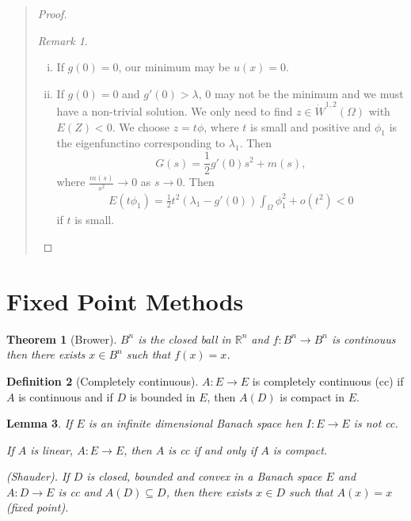 \documentclass[10pt, oneside, reqno]{amsart}
\theoremstyle{plain}%
\newtheorem{thm}{Theorem}[section]
\newtheorem{lem}[thm]{Lemma}
\numberwithin{equation}{section}
\theoremstyle{definition}
\newtheorem{defn}[thm]{Definition}
\theoremstyle{remark}
\newtheorem*{rem}{Remark}
\newcommand{\R}{\mathbb{R}}
\begin{document}
\begin{quote}
\begin{proof}
	\begin{rem}{\ }
		\begin{enumerate}[(i)]
			\item If $g(0) = 0$, our minimum may be $u(x) = 0$.  
			\item If $g(0) = 0$ and $g'(0) > \lambda$, $0$ may not be the minimum and we must have a non-trivial solution.  We only need to find $z \in \dot W^{1, 2}(\Omega)$ with $E(Z) < 0$.  We choose $z = t \phi$, where $t$ is small and positive and $\phi_1$ is the eigenfunctino corresponding to $\lambda_1$.  Then \[
				G(s) = \frac{1}{2} g'(0) s^2 + m(s),
			\] where $\frac{m(s)}{s^2} \rightarrow 0$ as $s \rightarrow 0$.  Then \begin{align*}
			E(t \phi_1) = \frac{1}{2} t^2 \left( \lambda_1 - g'(0) \right) \int_\Omega \phi_1^2 + o(t^2)  < 0	
			\end{align*} if $t$ is small.
		\end{enumerate}
	\end{rem}
\end{proof}  


\end{quote}


\section{Fixed Point Methods} %
\label{sec:fixed_point_methods}
\begin{thm}[Brower]
	$B^n$ is the closed ball in $\R^n$ and $f: B^n \rightarrow B^n$ is continouus then there exists $x \in B^n$ such that $f(x) = x$.  
\end{thm}


\begin{defn}[Completely continuous]
	$A: E \rightarrow E$ is completely continuous (cc) if $A$ is continuous and if $D$ is bounded in $E$, then $A(D)$ is compact in $E$.  
\end{defn}

\begin{lem}
	If $E$ is an infinite dimensional Banach space hen $I: E \rightarrow E$ is not cc.  
	
	If $A$ is linear, $A : E \rightarrow E$, then $A$ is cc if and only if $A$ is compact.  
	
	(Shauder).  If $D$ is closed, bounded and convex in a Banach space $E$ and $A: D \rightarrow E$ is cc and $A(D) \subseteq D$, then there exists $x \in D$ such that $A(x) = x$ (fixed point).
\end{lem}
\end{document}
